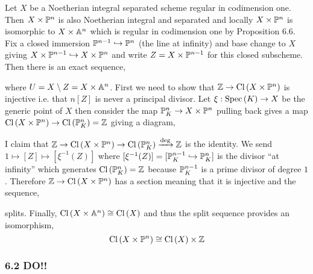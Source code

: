 \documentclass[12pt]{article}
\begin{document}
Let $X$ be a Noetherian integral separated scheme regular in codimension one. Then $X \times \P^n$ is also Noetherian integral and separated and locally $X \times \P^n$ is isomorphic to $X \times \A^n$ which is regular in codimension one by Proposition 6.6. Fix a closed immersion $\P^{n-1} \embed \P^n$ (the line at infinity) and base change to $X$ giving $X \times \P^{n-1} \embed X \times \P^n$ and write $Z = X \times \P^{n-1}$ for this closed subscheme. Then there is an exact sequence,
\begin{center}
\end{center}
where $U = X \setminus Z = X \times \A^n$. First we need to show that $\Z \to \Cl{X \times \P^n}$ is injective i.e. that $n [Z]$ is never a principal divisor. Let $\xi : \Spec{K} \to X$ be the generic point of $X$ then consider the map $\P^n_K \to X \times \P^n$ pulling back gives a map $\Cl{X \times \P^n} \to \Cl{\P^n_K} = \Z$ giving a diagram,
\begin{center}
\end{center}
I claim that $\Z \to \Cl{X \times \P^n} \to \Cl{\P^n_K} \xrightarrow{\deg} \Z$ is the identity. We send $1 \mapsto [Z] \mapsto [\xi^{-1}(Z)]$ where $[\xi^{-1}(Z)] = [\P^{n-1}_K \embed \P^n_K]$ is the divisor ``at infinity'' which generates $\Cl{\P^n_K} = \Z$ because $\P^{n-1}_K$ is a prime divisor of degree $1$. Therefore $\Z \to \Cl{X \times \P^n}$ has a section meaning that it is injective and the sequence,
\begin{center}
\end{center}
splits. Finally, $\Cl{X \times \A^n} \cong \Cl{X}$ and thus the split sequence provides an isomorphism, 
\[ \Cl{X \times \P^n} \cong \Cl{X} \times \Z \]

\subsubsection{6.2 DO!!}
\end{document}
